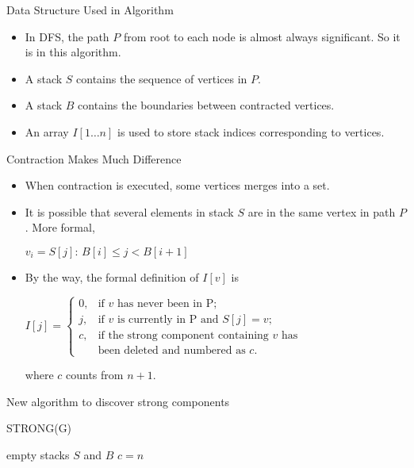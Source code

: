 \documentclass{beamer}
\begin{document}
\begin{frame}{Data Structure Used in Algorithm}
	\begin{itemize}
		\item
		In DFS, the \alert{path $P$} from root to each node is almost always significant. So it is in this algorithm.
		\item
		A \alert{stack $S$} contains the sequence of vertices in $P$.
		\item
		A \alert{stack $B$} contains the boundaries between contracted vertices.
		\item
		An array \alert{$I[1\ldots n]$} is used to store stack indices corresponding to vertices.
	\end{itemize}
\end{frame}

\begin{frame}{Contraction Makes Much Difference}
	\begin{itemize}
		\item
		When contraction is executed, some vertices merges into a set.
		\item
		It is possible that several elements in stack $S$ are in the same vertex in path $P$.
		More formal, 
		\begin{center}
			$v_i={S[j]:\, B[i]\leq j< B[i+1]}$
		\end{center}
		\item
		By the way, the formal definition of $I[v]$ is
		\begin{center}
			$I[j]=\begin{cases}
			0, & \text{if }v\text{ has never been in P;} \\
			j, & \text{if }v\text{ is currently in P and }S[j]=v\text{;} \\
			c, & \text{if the strong component containing }v\text{ has}\\
			& \text{been deleted and numbered as }c\text{.}
			\end{cases}$
		\end{center}
		where $c$ counts from $n+1$.
	\end{itemize}
\end{frame}

\begin{frame}[fragile]{New algorithm to discover strong components}
	\SetAlFnt{\normalsize}
	\begin{procedure}[H]
		\caption{STRONG(G)}
		empty stacks $S$ and $B$\;
		$c=n$\;
	\end{procedure}
\end{frame}
\end{document}
